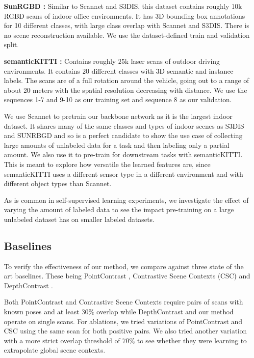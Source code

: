 \documentclass[10pt,twocolumn,letterpaper]{article}
\begin{document}
\textbf{SunRGBD \cite{song2015sunrgbd, janoch2011category, xiao2013database, silberman2012indoor}:} Similar to Scannet and S3DIS, this dataset contains roughly 10k RGBD scans of indoor office environments. It has 3D bounding box annotations for 10 different classes, with large class overlap with Scannet and S3DIS. There is no scene reconstruction available. We use the dataset-defined train and validation split.

\textbf{semanticKITTI \cite{behley2019semantic, geiger2012are}: } Contains roughly 25k laser scans of outdoor driving environments. It contains 20 different classes with 3D semantic and instance labels. The scans are of a full rotation around the vehicle, going out to a range of about 20 meters with the spatial resolution decreasing with distance. We use the sequences 1-7 and 9-10 as our training set and sequence 8 as our validation.

We use Scannet to pretrain our backbone network as it is the largest indoor dataset. It shares many of the same classes and types of indoor scenes as S3DIS and SUNRBGD and so is a perfect candidate to show the use case of collecting large amounts of unlabeled data for a task and then labeling only a partial amount. We also use it to pre-train for downstream tasks with semanticKITTI. This is meant to explore how versatile the learned features are, since semanticKITTI uses a different sensor type in a different environment and with different object types than Scannet.

As is common in self-supervised learning experiments, we investigate the effect of varying the amount of labeled data to see the impact pre-training on a large unlabeled dataset has on smaller labeled datasets.

\subsection{Baselines}
\label{sec:results:baselines}

To verify the effectiveness of our method, we compare against three state of the art baselines. These being PointContrast \cite{xie2020pointcontrast}, Contrastive Scene Contexts (CSC) \cite{hou2021Exploring} and DepthContrast \cite{zhang2021Self}.

Both PointContrast and Contrastive Scene Contexts require pairs of scans with known poses and at least 30\% overlap while DepthContrast and our method operate on single scans. For ablations, we tried variations of PointContrast and CSC using the same scan for both positive pairs. We also tried another variation with a more strict overlap threshold of 70\% to see whether they were learning to extrapolate global scene contexts.
\end{document}
